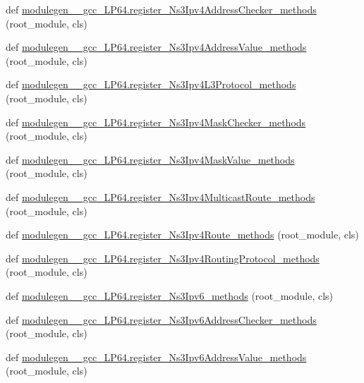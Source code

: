 \begin{DoxyCompactItemize}
\item 
def \hyperlink{namespacemodulegen____gcc__LP64_adc0fd34fe5054bad708a40699ec19c68}{modulegen\+\_\+\+\_\+gcc\+\_\+\+L\+P64.\+register\+\_\+\+Ns3\+Ipv4\+Address\+Checker\+\_\+methods} (root\+\_\+module, cls)
\item 
def \hyperlink{namespacemodulegen____gcc__LP64_a790c617791e5a0c735de031e06684232}{modulegen\+\_\+\+\_\+gcc\+\_\+\+L\+P64.\+register\+\_\+\+Ns3\+Ipv4\+Address\+Value\+\_\+methods} (root\+\_\+module, cls)
\item 
def \hyperlink{namespacemodulegen____gcc__LP64_afd2c37ad48541e83ccaf9a4e07b1028e}{modulegen\+\_\+\+\_\+gcc\+\_\+\+L\+P64.\+register\+\_\+\+Ns3\+Ipv4\+L3\+Protocol\+\_\+methods} (root\+\_\+module, cls)
\item 
def \hyperlink{namespacemodulegen____gcc__LP64_a2a6820145ab3bf977a66f5c0ee7f5cb9}{modulegen\+\_\+\+\_\+gcc\+\_\+\+L\+P64.\+register\+\_\+\+Ns3\+Ipv4\+Mask\+Checker\+\_\+methods} (root\+\_\+module, cls)
\item 
def \hyperlink{namespacemodulegen____gcc__LP64_abcaf7e9c479182a07e377ce5e986a998}{modulegen\+\_\+\+\_\+gcc\+\_\+\+L\+P64.\+register\+\_\+\+Ns3\+Ipv4\+Mask\+Value\+\_\+methods} (root\+\_\+module, cls)
\item 
def \hyperlink{namespacemodulegen____gcc__LP64_aa0d37bf64d44dc8927491a65c8d36272}{modulegen\+\_\+\+\_\+gcc\+\_\+\+L\+P64.\+register\+\_\+\+Ns3\+Ipv4\+Multicast\+Route\+\_\+methods} (root\+\_\+module, cls)
\item 
def \hyperlink{namespacemodulegen____gcc__LP64_af14da863162a933698edabc4eaef7a94}{modulegen\+\_\+\+\_\+gcc\+\_\+\+L\+P64.\+register\+\_\+\+Ns3\+Ipv4\+Route\+\_\+methods} (root\+\_\+module, cls)
\item 
def \hyperlink{namespacemodulegen____gcc__LP64_a18d8c812fcb41eb954acfff250d9891f}{modulegen\+\_\+\+\_\+gcc\+\_\+\+L\+P64.\+register\+\_\+\+Ns3\+Ipv4\+Routing\+Protocol\+\_\+methods} (root\+\_\+module, cls)
\item 
def \hyperlink{namespacemodulegen____gcc__LP64_a088193b37f926430eb00981681c4dced}{modulegen\+\_\+\+\_\+gcc\+\_\+\+L\+P64.\+register\+\_\+\+Ns3\+Ipv6\+\_\+methods} (root\+\_\+module, cls)
\item 
def \hyperlink{namespacemodulegen____gcc__LP64_ad1f9cec8b591983bb09444b16062156d}{modulegen\+\_\+\+\_\+gcc\+\_\+\+L\+P64.\+register\+\_\+\+Ns3\+Ipv6\+Address\+Checker\+\_\+methods} (root\+\_\+module, cls)
\item 
def \hyperlink{namespacemodulegen____gcc__LP64_ab829e3fded47f86a33a84e69215707ca}{modulegen\+\_\+\+\_\+gcc\+\_\+\+L\+P64.\+register\+\_\+\+Ns3\+Ipv6\+Address\+Value\+\_\+methods} (root\+\_\+module, cls)

\end{DoxyCompactItemize}
